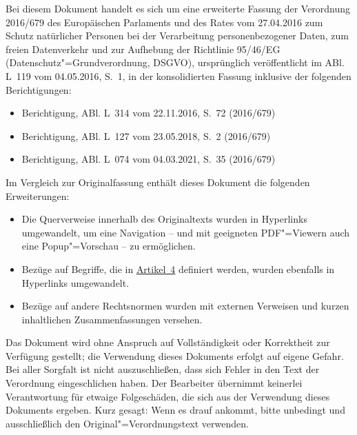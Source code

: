 
Bei diesem Dokument handelt es sich um eine erweiterte Fassung der Verordnung 2016/679 des Europäischen Parlaments und
des Rates vom 27.04.2016 zum Schutz natürlicher Personen bei der Verarbeitung personenbezogener Daten, zum freien
Datenverkehr und zur Aufhebung der Richtlinie 95/46/EG (Datenschutz"=Grundverordnung, DSGVO), ursprünglich
veröffentlicht im ABl. L~119 vom 04.05.2016, S.~1, in der konsolidierten Fassung inklusive der folgenden
Berichtigungen:

\begin{itemize}
  \item Berichtigung, ABl. L~314 vom 22.11.2016, S.~72 (2016/679)
  \item Berichtigung, ABl. L~127 vom 23.05.2018, S.~2 (2016/679)
  \item Berichtigung, ABl. L~074 vom 04.03.2021, S.~35 (2016/679)
\end{itemize}

Im Vergleich zur Originalfassung enthält dieses Dokument die folgenden Erweiterungen:

\begin{itemize}

  \item Die Querverweise innerhalb des Originaltexts wurden in Hyperlinks umgewandelt, um eine Navigation -- und
   mit geeigneten PDF"=Viewern auch eine Popup"=Vorschau -- zu ermöglichen.

  \item Bezüge auf Begriffe, die in \hyperref[ch:4]{Artikel~4} definiert werden, wurden ebenfalls in Hyperlinks
   umgewandelt.

  \item Bezüge auf andere Rechtsnormen wurden mit externen Verweisen und kurzen inhaltlichen Zusammenfassungen versehen.

\end{itemize}

Das Dokument wird ohne Anspruch auf Vollständigkeit oder Korrektheit zur Verfügung gestellt; die Verwendung dieses
Dokuments erfolgt auf eigene Gefahr. Bei aller Sorgfalt ist nicht auszuschließen, dass sich Fehler in den Text der
Verordnung eingeschlichen haben. Der Bearbeiter übernimmt keinerlei Verantwortung für etwaige Folgeschäden, die sich
aus der Verwendung dieses Dokuments ergeben. Kurz gesagt: Wenn es drauf ankommt, bitte unbedingt und ausschließlich den
Original"=Verordnungstext verwenden.
